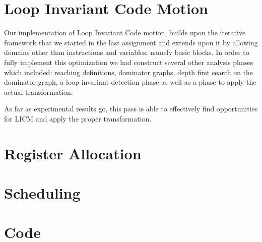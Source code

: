 \documentclass[12pt]{article}
\begin{document}
\section{Loop Invariant Code Motion}
Our implementation of Loop Invariant Code motion, builds upon the iterative
framework that we started in the last assignment and extends upon it by
allowing domains other than instructions and variables, namely basic
blocks. In order to fully implement this optimization we had construct several
other analysis phases which included: reaching definitions, dominator graphs,
depth first search on the dominator graph, a loop invariant detection phase as
well as a phase to apply the actual transformation.

As far as experimental results go, this pass is able to effectively find
opportunities for LICM and apply the proper transformation.

\section{Register Allocation}



\section{Scheduling}


\section{Code}





\end{document}
